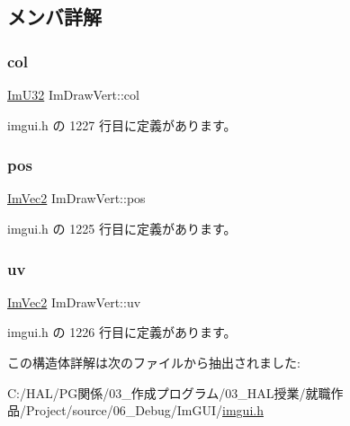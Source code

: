 \subsection{メンバ詳解}
\mbox{\label{struct_im_draw_vert_ab98ba53ce2690b56f5ba94682ed83940}} 
\subsubsection{\texorpdfstring{col}{col}}
{\footnotesize\ttfamily \mbox{\hyperlink{imgui_8h_a118cff4eeb8d00e7d07ce3d6460eed36}{Im\+U32}} Im\+Draw\+Vert\+::col}



 imgui.\+h の 1227 行目に定義があります。

\mbox{\label{struct_im_draw_vert_aedc578bbf364ddea71be12b4f177a5b4}} 
\subsubsection{\texorpdfstring{pos}{pos}}
{\footnotesize\ttfamily \mbox{\hyperlink{struct_im_vec2}{Im\+Vec2}} Im\+Draw\+Vert\+::pos}



 imgui.\+h の 1225 行目に定義があります。

\mbox{\label{struct_im_draw_vert_abdf3183529055a6c3f709b23a4bf06b1}} 
\subsubsection{\texorpdfstring{uv}{uv}}
{\footnotesize\ttfamily \mbox{\hyperlink{struct_im_vec2}{Im\+Vec2}} Im\+Draw\+Vert\+::uv}



 imgui.\+h の 1226 行目に定義があります。



この構造体詳解は次のファイルから抽出されました\+:\begin{DoxyCompactItemize}
\item 
C\+:/\+H\+A\+L/\+P\+G関係/03\+\_\+作成プログラム/03\+\_\+\+H\+A\+L授業/就職作品/\+Project/source/06\+\_\+\+Debug/\+Im\+G\+U\+I/\mbox{\hyperlink{imgui_8h}{imgui.\+h}}\end{DoxyCompactItemize}
